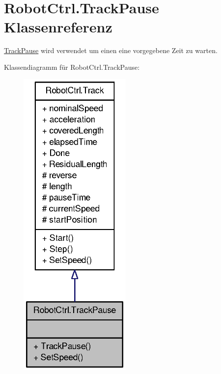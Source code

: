 \hypertarget{class_robot_ctrl_1_1_track_pause}{
\section{RobotCtrl.TrackPause Klassenreferenz}
\label{class_robot_ctrl_1_1_track_pause}
}


\hyperlink{class_robot_ctrl_1_1_track_pause}{TrackPause} wird verwendet um einen eine vorgegebene Zeit zu warten.  




Klassendiagramm für RobotCtrl.TrackPause:\nopagebreak
\begin{figure}[H]
\begin{center}
\leavevmode
\includegraphics[width=156pt]{class_robot_ctrl_1_1_track_pause__inherit__graph}
\end{center}
\end{figure}


